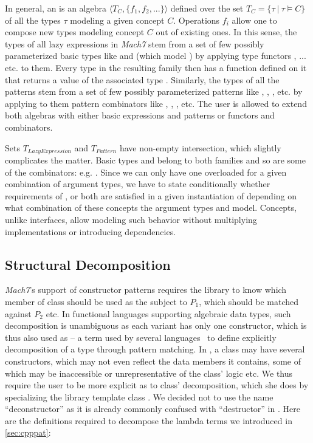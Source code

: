 In general, an  is an algebra $\langle T_C,\{f_1,f_2,...\}\rangle$ 
defined over the set $T_C = \{\tau~|~\tau \models C\}$ of all the types $\tau$ 
modeling a given concept $C$. Operations $f_i$ allow one to compose new types  
modeling concept $C$ out of existing ones. In this sense, the types of all lazy 
expressions in \emph{Mach7} stem from a set of few possibly parameterized basic 
types like  and  (which model ) 
by applying type functors ,  ... etc. to them. Every type 
in the resulting family then has a function  defined on it that 
returns a value of the associated type . Similarly, the types 
of all the patterns stem from a set of few possibly parameterized patterns like 
, , ,  etc. by applying to 
them pattern combinators like , , 
,  etc. The user is allowed to extend both 
algebras with either basic expressions and patterns or functors and combinators. 

Sets $T_{LazyExpression}$ and $T_{Pattern}$ have non-empty intersection, which 
slightly complicates the matter. Basic types  and  
belong to both families and so are some of the combinators: e.g. 
. Since we can only have one overloaded  for 
a given combination of argument types, we have to state conditionally whether 
requirements of ,  or both are satisfied in a 
given instantiation of  depending on what combination 
of these concepts the argument types  and  model. Concepts, 
unlike interfaces, allow modeling such behavior without multiplying 
implementations or introducing dependencies.

\subsection{Structural Decomposition}
\label{sec:bnd}

\emph{Mach7}'s support of constructor patterns  requires the 
library to know which member of class  should be used as the subject to 
$P_1$, which should be matched against $P_2$ etc. In functional languages 
supporting algebraic data types, such decomposition is unambiguous as each 
variant has only one constructor, which is thus also used as 
-- a term used by several languages~\cite{padl08,Thorn2012} to define explicitly
decomposition of a type through pattern matching. In \Cpp{}, a class may have 
several constructors, which may not even reflect the data members it contains, 
some of which may be inaccessible or unrepresentative of the class' logic etc. 
We thus require the user to be more explicit as to class' decomposition, which 
she does by specializing the library template class . We decided 
not to use the name ``deconstructor'' as it is already commonly confused with 
``destructor'' in \Cpp{}. Here are the definitions required to decompose the 
lambda terms we introduced in \textsection\ref{sec:cpppat}:

